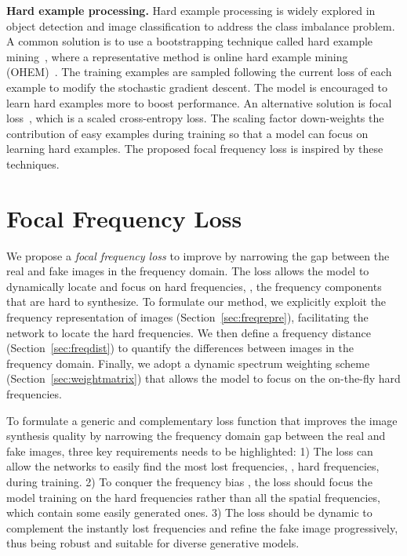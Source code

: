\documentclass[10pt,twocolumn,letterpaper]{article}
\begin{document}
\noindent
\textbf{Hard example processing.}
Hard example processing is widely explored in object detection and image classification to address the class imbalance problem.
A common solution is to use a bootstrapping technique called hard example mining~\cite{ohem,hempartmodel}, where a representative method is online hard example mining (OHEM)~\cite{ohem}. The training examples are sampled following the current loss of each example to modify the stochastic gradient descent. The model is encouraged to learn hard examples more to boost performance.
An alternative solution is focal loss~\cite{focalloss}, which is a scaled cross-entropy loss. The scaling factor down-weights the contribution of easy examples during training so that a model can focus on learning hard examples.
The proposed focal frequency loss is inspired by these techniques. 


%
 

\section{Focal Frequency Loss}
\label{sec:method}

We propose a \textit{focal frequency loss} to improve  by narrowing the gap between the real and fake images in the frequency domain.
The loss allows the model to dynamically locate and focus on hard frequencies, \ie, the frequency components that are hard to synthesize.
\fi
To formulate our method, we explicitly exploit the frequency representation of images (Section~\ref{sec:freqrepre}), facilitating the network to locate the hard frequencies.
We then define a frequency distance (Section~\ref{sec:freqdist}) to quantify the differences between images in the frequency domain.
Finally, we adopt a dynamic spectrum weighting scheme (Section~\ref{sec:weightmatrix}) that allows the model to focus on the on-the-fly hard frequencies.

To formulate a generic and complementary loss function that improves the image synthesis quality by narrowing the frequency domain gap between the real and fake images,
three key requirements needs to be highlighted:
1) The loss can allow the networks to easily find the most lost frequencies, \ie, hard frequencies, during training.
2) To conquer the frequency bias \cite{spectralbias,fprinciple}, the loss should focus the model training on the hard frequencies rather than all the spatial frequencies, which contain some easily generated ones.
3) The loss should be dynamic to complement the instantly lost frequencies and refine the fake image progressively, thus being robust and suitable for diverse generative models.
\end{document}
